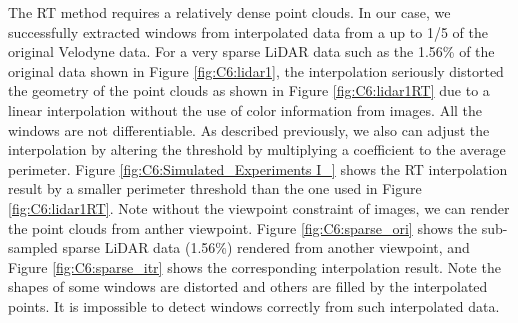 The RT method requires a relatively dense point clouds. In our case, we successfully extracted windows from interpolated data
from a up to 1/5 of the original Velodyne data. For a very sparse
LiDAR data such as the 1.56\% of the original data shown in 
Figure \ref{fig:C6:lidar1}, the interpolation seriously distorted the 
geometry of the point clouds as shown in Figure \ref{fig:C6:lidar1RT} due to a linear interpolation without the use of color information from images. All the windows are not differentiable. As described previously, we also can adjust the interpolation by altering the threshold by multiplying a coefficient to the average perimeter. Figure \ref {fig:C6:Simulated_Experiments I_} shows the RT interpolation result by a smaller perimeter threshold than the one used in Figure \ref{fig:C6:lidar1RT}. Note without the viewpoint constraint of images, we can render the point clouds  from anther viewpoint. Figure \ref{fig:C6:sparse_ori} shows the sub-sampled sparse LiDAR data (1.56\%) rendered from another viewpoint, and Figure \ref{fig:C6:sparse_itr} shows the corresponding interpolation result. Note the shapes of some windows are distorted and others are filled by the interpolated points. It is impossible to detect windows correctly from such interpolated data. 

